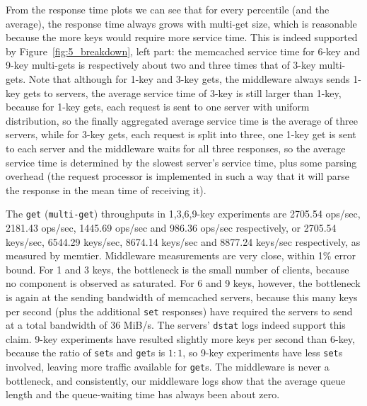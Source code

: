 
From the response time plots we can see that for every percentile (and the average), the response time always grows with multi-get size, which is reasonable because the more keys would require more service time. This is indeed supported by Figure~\ref{fig:5_breakdown}, left part: the memcached service time for 6-key and 9-key multi-gets is respectively about two and three times that of 3-key multi-gets. Note that although for 1-key and 3-key gets, the middleware always sends 1-key gets to servers, the average service time of 3-key is still larger than 1-key, because for 1-key gets, each request is sent to one server with uniform distribution, so the finally aggregated average service time is the average of three servers, while for 3-key gets, each request is split into three, one 1-key get is sent to each server and the middleware waits for all three responses, so the average service time is determined by the slowest server's service time, plus some parsing overhead (the request processor is implemented in such a way that it will parse the response in the mean time of receiving it). 

The \texttt{get} (\texttt{multi-get}) throughputs in 1,3,6,9-key experiments are 2705.54 ops/sec, 2181.43 ops/sec, 1445.69 ops/sec and 986.36 ops/sec respectively, or
2705.54 keys/sec, 6544.29 keys/sec, 8674.14 keys/sec and 8877.24 keys/sec respectively, as measured by memtier. Middleware measurements are very close, within 1\% error bound. For 1 and 3 keys, the bottleneck is the small number of clients, because no component is observed as saturated. For 6 and 9 keys, however, the bottleneck is again at the sending bandwidth of memcached servers, because this many keys per second (plus the additional \texttt{set} responses) have required the servers to send at a total bandwidth of 36 MiB/s. The servers' \texttt{dstat} logs indeed support this claim. 9-key experiments have resulted slightly more keys per second than 6-key, because the ratio of \texttt{set}s and \texttt{get}s is $1:1$, so 9-key experiments have less \texttt{set}s involved, leaving more traffic available for \texttt{get}s. The middleware is never a bottleneck, and consistently, our middleware logs show that the average queue length and the queue-waiting time has always been about zero.


